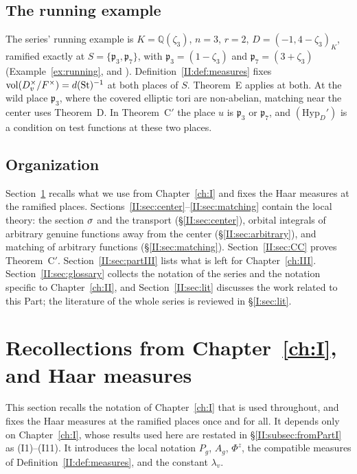\subsection*{The running example}
The series' running example is $K=\mathbb{Q}(\zeta_3)$, $n=3$, $r=2$, $D=(-1,4-\zeta_3)_K$, ramified exactly at $S=\{\mathfrak p_3,\mathfrak p_7\}$, with $\mathfrak p_3=(1-\zeta_3)$ and $\mathfrak p_7=(3+\zeta_3)$ (Example~\ref{ex:running}, and \cite{JC26b}). Definition~\ref{II:def:measures} fixes $\mathrm{vol}(D_v^\times/F^\times)=d(\mathrm{St})^{-1}$ at both places of $S$. Theorem~E applies at both. At the wild place $\mathfrak p_3$, where the covered elliptic tori are non-abelian, matching near the center uses Theorem~D. In Theorem~C$'$ the place $u$ is $\mathfrak p_3$ or $\mathfrak p_7$, and $(\mathrm{Hyp}_D')$ is a condition on test functions at these two places.

\subsection{Organization}
Section~\ref{II:sec:recall} recalls what we use from Chapter~\ref{ch:I} and fixes the Haar measures at the ramified places. Sections~\ref{II:sec:center}--\ref{II:sec:matching} contain the local theory: the section $\sigma$ and the transport (\S\ref{II:sec:center}), orbital integrals of arbitrary genuine functions away from the center (\S\ref{II:sec:arbitrary}), and matching of arbitrary functions (\S\ref{II:sec:matching}). Section~\ref{II:sec:CC} proves Theorem~C$'$. Section~\ref{II:sec:partIII} lists what is left for Chapter~\ref{ch:III}. Section~\ref{II:sec:glossary} collects the notation of the series and the notation specific to Chapter~\ref{ch:II}, and Section~\ref{II:sec:lit} discusses the work related to this Part; the literature of the whole series is reviewed in \S\ref{I:sec:lit}.

\section{Recollections from Chapter~\ref{ch:I}, and Haar measures}\label{II:sec:recall}
This section recalls the notation of Chapter~\ref{ch:I} that is used throughout, and fixes the Haar measures at the ramified places once and for all. It depends only on Chapter~\ref{ch:I}, whose results used here are restated in \S\ref{II:subsec:fromPartI} as (I1)--(I11). It introduces the local notation $P_g$, $A_g$, $\Phi^z$, the compatible measures of Definition~\ref{II:def:measures}, and the constant $\lambda_v$.

